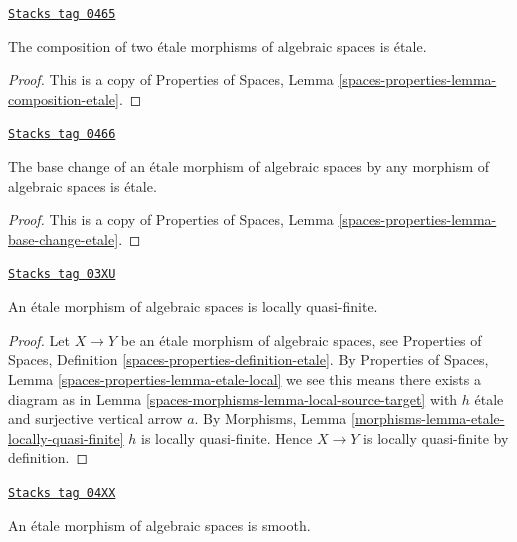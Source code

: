 \begin{lemma}
\label{spaces-morphisms-lemma-composition-etale}
\href{https://stacks.math.columbia.edu/tag/0465}{\texttt{Stacks tag 0465}}

The composition of two \'etale morphisms of algebraic spaces
is \'etale.
\end{lemma}

\begin{proof}
This is a copy of
Properties of Spaces, Lemma \ref{spaces-properties-lemma-composition-etale}.
\end{proof}

\begin{lemma}
\label{spaces-morphisms-lemma-base-change-etale}
\href{https://stacks.math.columbia.edu/tag/0466}{\texttt{Stacks tag 0466}}

The base change of an \'etale morphism of algebraic spaces
by any morphism of algebraic spaces is \'etale.
\end{lemma}

\begin{proof}
This is a copy of
Properties of Spaces, Lemma \ref{spaces-properties-lemma-base-change-etale}.
\end{proof}

\begin{lemma}
\label{spaces-morphisms-lemma-etale-locally-quasi-finite}
\href{https://stacks.math.columbia.edu/tag/03XU}{\texttt{Stacks tag 03XU}}

An \'etale morphism of algebraic spaces is locally quasi-finite.
\end{lemma}

\begin{proof}
Let $X \to Y$ be an \'etale morphism of algebraic spaces, see
Properties of Spaces, Definition \ref{spaces-properties-definition-etale}.
By
Properties of Spaces, Lemma \ref{spaces-properties-lemma-etale-local}
we see this means there exists a diagram as in
Lemma \ref{spaces-morphisms-lemma-local-source-target}
with $h$ \'etale and surjective vertical arrow $a$. By
Morphisms, Lemma \ref{morphisms-lemma-etale-locally-quasi-finite}
$h$ is locally quasi-finite. Hence $X \to Y$ is locally quasi-finite
by definition.
\end{proof}

\begin{lemma}
\label{spaces-morphisms-lemma-etale-smooth}
\href{https://stacks.math.columbia.edu/tag/04XX}{\texttt{Stacks tag 04XX}}

An \'etale morphism of algebraic spaces is smooth.
\end{lemma}

